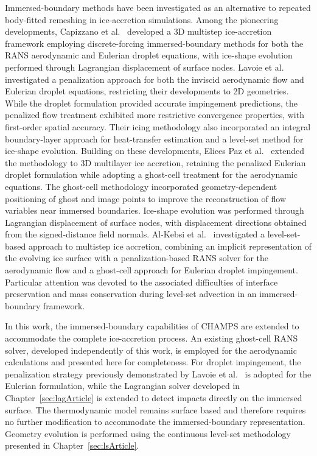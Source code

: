 Immersed-boundary methods have been investigated as an alternative to repeated body-fitted remeshing in ice-accretion simulations. Among the pioneering developments, Capizzano et al.~\cite{capizzano2014eulerian,capizzanoIcing} developed a 3D multistep ice-accretion framework employing discrete-forcing immersed-boundary methods for both the RANS aerodynamic and Eulerian droplet equations, with ice-shape evolution performed through Lagrangian displacement of surface nodes. Lavoie et al.~\cite{lavoieDroplets, lavoie2021immersed} investigated a penalization approach for both the inviscid aerodynamic flow and Eulerian droplet equations, restricting their developments to 2D geometries. While the droplet formulation provided accurate impingement predictions, the penalized flow treatment exhibited more restrictive convergence properties, with first-order spatial accuracy. Their icing methodology also incorporated an integral boundary-layer approach for heat-transfer estimation and a level-set method for ice-shape evolution. Building on these developments, Elices Paz et al.~\cite{pabloIcing, pabloThesis} extended the methodology to 3D multilayer ice accretion, retaining the penalized Eulerian droplet formulation while adopting a ghost-cell treatment for the aerodynamic equations. The ghost-cell methodology incorporated geometry-dependent positioning of ghost and image points to improve the reconstruction of flow variables near immersed boundaries. Ice-shape evolution was performed through Lagrangian displacement of surface nodes, with displacement directions obtained from the signed-distance field normals. Al-Kebsi et al.~\cite{alkebsiPhd} investigated a level-set-based approach to multistep ice accretion, combining an implicit representation of the evolving ice surface with a penalization-based RANS solver for the aerodynamic flow and a ghost-cell approach for Eulerian droplet impingement. Particular attention was devoted to the associated difficulties of interface preservation and mass conservation during level-set advection in an immersed-boundary framework.

In this work, the immersed-boundary capabilities of \textsc{CHAMPS} are extended to accommodate the complete ice-accretion process. An existing ghost-cell RANS solver, developed independently of this work, is employed for the aerodynamic calculations and presented here for completeness. For droplet impingement, the penalization strategy previously demonstrated by Lavoie et al.~\cite{lavoieDroplets} is adopted for the Eulerian formulation, while the Lagrangian solver developed in Chapter~\ref{sec:lagArticle} is extended to detect impacts directly on the immersed surface. The thermodynamic model remains surface based and therefore requires no further modification to accommodate the immersed-boundary representation. Geometry evolution is performed using the continuous level-set methodology presented in Chapter~\ref{sec:lsArticle}.

